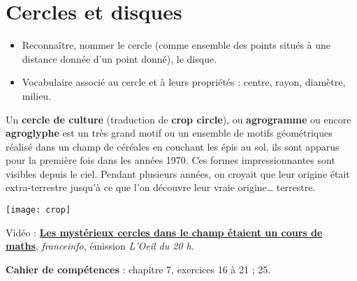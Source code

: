 \themaG
\graphicspath{{../Ch5_Le_cercle/Images/}}

\chapter{Cercles et disques}
\label{C12}


\begin{prerequis}
   \begin{itemize}
      \item Reconnaître, nommer le cercle (comme ensemble des points situés à une distance donnée d’un point donné), le disque.
      \item Vocabulaire associé au cercle et à leurs propriétés : centre, rayon, diamètre, milieu.
   \end{itemize}
\end{prerequis}

\vfill

\begin{debat} 
   Un {\bf cercle de culture} (traduction de {\bf crop circle}), ou {\bf agrogramme} ou encore {\bf agroglyphe} est un très grand motif ou un ensemble de motifs géométriques réalisé dans un champ de céréales en couchant les épis au sol, ils sont apparus pour la première fois dans les années 1970. Ces formes impressionnantes sont visibles depuis le ciel. Pendant plusieurs années, on croyait que leur origine était extra-terrestre jusqu'à ce que l'on découvre leur vraie origine\dots{} terrestre.
   \begin{center} 
      \texttt{[image: crop]}
   \end{center}
   \bigskip
   \begin{cadre}[B2][F4]
      \begin{center}
         Vidéo : \href{https://www.francetvinfo.fr/replay-jt/france-2/20-heures/video-en-alsace-les-mysterieux-cercles-dans-le-champ-etaient-un-cours-de-maths_3505711.html}{\bf Les mystérieux cercles dans le champ étaient un cours de maths}, {\it franceinfo}, émission {\it L'Oeil du 20 h}.
      \end{center}
   \end{cadre}
\end{debat}

\vfill

\textcolor{PartieGeometrie}{\sffamily\bfseries Cahier de compétences} : chapitre 7, exercices 16 à 21 ; 25.


